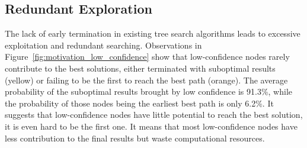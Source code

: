 


\subsection{Redundant Exploration}
\label{sec:3.2}


The lack of early termination in existing tree search algorithms leads to excessive exploitation and redundant searching. Observations in Figure~\ref{fig:motivation_low_confidence} show that low-confidence nodes rarely contribute to the best solutions, either terminated with suboptimal results (yellow) or failing to be the first to reach the best path (orange). The average probability of the suboptimal results brought by low confidence is 91.3\%, while the probability of those nodes being the earliest best path is only 6.2\%. It suggests that low-confidence nodes have little potential to reach the best solution, it is even hard to be the first one. It means that most low-confidence nodes have less contribution to the final results but waste computational resources. 





